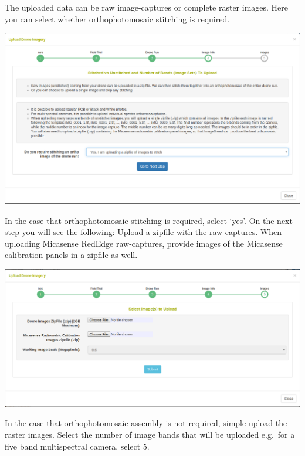 \documentclass[
  12pt,
]{book}
\begin{document}
The uploaded data can be raw image-captures or complete raster images. Here you can select whether orthophotomosaic stitching is required.

\begin{center}\includegraphics[width=0.95\linewidth]{assets/images/manage_image_phenotyping_upload_image_info_2} \end{center}

In the case that orthophotomosaic stitching is required, select `yes'. On the next step you will see the following: Upload a zipfile with the raw-captures. When uploading Micasense RedEdge raw-captures, provide images of the Micasense calibration panels in a zipfile as well.

\begin{center}\includegraphics[width=0.95\linewidth]{assets/images/manage_image_phenotyping_upload_images_zipfile} \end{center}

In the case that orthophotomosaic assembly is not required, simple upload the raster images. Select the number of image bands that will be uploaded e.g.~for a five band multispectral camera, select 5.
\end{document}
